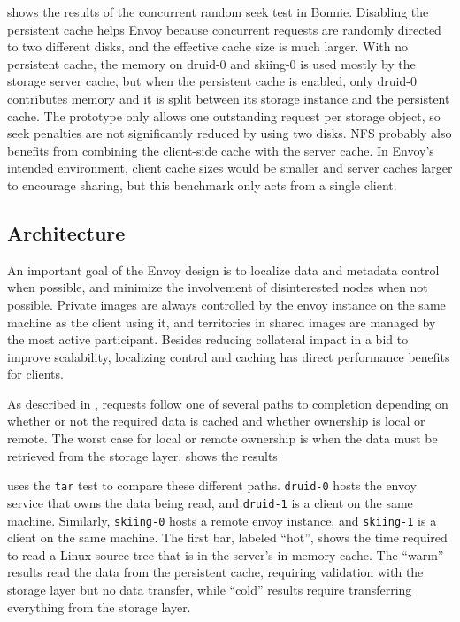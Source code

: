  shows the results of the concurrent random seek test in Bonnie. Disabling the persistent cache helps Envoy because concurrent requests are randomly directed to two different disks, and the effective cache size is much larger. With no persistent cache, the memory on druid-0 and skiing-0 is used mostly by the storage server cache, but when the persistent cache is enabled, only druid-0 contributes memory and it is split between its storage instance and the persistent cache. The prototype only allows one outstanding request per storage object, so seek penalties are not significantly reduced by using two disks. NFS probably also benefits from combining the client-side cache with the server cache. In Envoy's intended environment, client cache sizes would be smaller and server caches larger to encourage sharing, but this benchmark only acts from a single client.

\subsection{Architecture}\label{sec:architectural-costs}

An important goal of the Envoy design is to localize data and metadata control when possible, and minimize the involvement of disinterested nodes when not possible. Private images are always controlled by the envoy instance on the same machine as the client using it, and territories in shared images are managed by the most active participant. Besides reducing collateral impact in a bid to improve scalability, localizing control and caching has direct performance benefits for clients.

As described in , requests follow one of several paths to completion depending on whether or not the required data is cached and whether ownership is local or remote. The worst case for local or remote ownership is when the data must be retrieved from the storage layer.  shows the results 

 uses the \texttt{tar} test to compare these different paths. \texttt{druid-0} hosts the envoy service that owns the data being read, and \texttt{druid-1} is a client on the same machine. Similarly, \texttt{skiing-0} hosts a remote envoy instance, and \texttt{skiing-1} is a client on the same machine. The first bar, labeled ``hot'', shows the time required to read a Linux source tree that is in the server's in-memory cache. The ``warm'' results read the data from the persistent cache, requiring validation with the storage layer but no data transfer, while ``cold'' results require transferring everything from the storage layer.


